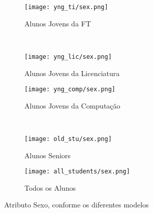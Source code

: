 \clearpage
\begin{figure}[!ht]
    \centering
    \begin{subfigure}[b]{0.48\textwidth}
        \centering
        \texttt{[image: yng\_ti/sex.png]}
        \caption{Alunos Jovens da FT}
    \end{subfigure}
    ~
    \begin{subfigure}[b]{0.48\textwidth}
        \centering
        \texttt{[image: yng\_lic/sex.png]}
        \caption{Alunos Jovens da Licenciatura}
    \end{subfigure}

    \begin{subfigure}[b]{0.48\textwidth}
        \centering
        \texttt{[image: yng\_comp/sex.png]}
        \caption{Alunos Jovens da Computação}
    \end{subfigure}
    ~
    \begin{subfigure}[b]{0.48\textwidth}
        \centering
        \texttt{[image: old\_stu/sex.png]}
        \caption{Alunos Seniors}
    \end{subfigure}

    \begin{subfigure}[b]{0.48\textwidth}
        \centering
        \texttt{[image: all\_students/sex.png]}
        \caption{Todos os Alunos}
    \end{subfigure}
    \caption{Atributo Sexo, conforme os diferentes modelos}
\end{figure}

